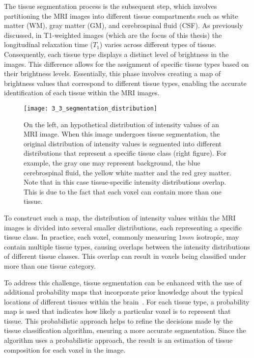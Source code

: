 The tissue segmentation process is the subsequent step, which involves
partitioning the MRI images into different tissue compartments such as white
matter (WM), gray matter (GM), and cerebrospinal fluid (CSF). As previously
discussed, in T1-weighted images (which are the focus of this thesis) the
longitudinal relaxation time ($T_1$) varies across different types of tissue.
Consequently, each tissue type displays a distinct level of brightness in the
images. This difference allows for the assignment of specific tissue types based
on their brightness levels. Essentially, this phase involves creating a map of
brightness values that correspond to different tissue types, enabling the
accurate identification of each tissue within the MRI images.
\begin{figure*}
    \texttt{[image: 3\_3\_segmentation\_distribution]}
    \caption[Segmentation (Values Distribution)]{On the left, an hypothetical
    distribution of intensity values of an MRI image. When this image undergoes
    tissue segmentation, the original distribution of intensity values is
    segmented into different distributions that represent a specific tissue
    class (right figure). For example, the gray one may represent background,
    the blue cerebrospinal fluid, the yellow white matter and the red grey
    matter. Note that in this case tissue-specific intensity distributions
    overlap. This is due to the fact that each voxel can contain more than one
    tissue.}
\end{figure*}
To construct such a map, the distribution of intensity values within the MRI
images is divided into several smaller distributions, each representing a
specific tissue class. In practice, each voxel, commonly measuring $1mm$ isotropic, may contain multiple tissue types, causing overlaps
between the intensity distributions of different tissue classes. This overlap
can result in voxels being classified under more than one tissue category.

To address this challenge, tissue segmentation can be enhanced with the use of
additional probability maps that incorporate prior knowledge about the typical
locations of different tissues within the
brain~. For each tissue type, a
probability map is used that indicates how likely a particular voxel is to
represent that tissue. This probabilistic approach helps to refine the decisions
made by the tissue classification algorithm, ensuring a more accurate
segmentation. Since the algorithm uses a probabilistic approach, the result is
an estimation of tissue composition for each voxel in the image.

